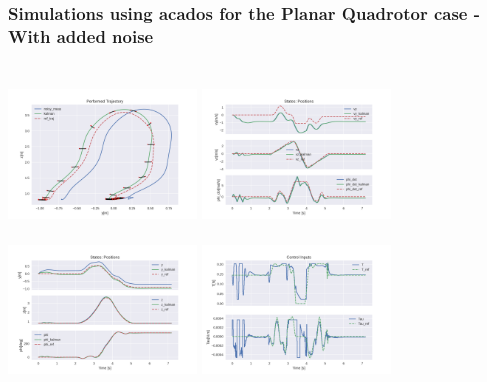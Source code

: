 \documentclass{thesisbeamer}
\newcommand\Fontvi{\fontsize{9}{10}\selectfont}
\begin{document}
\begin{frame}
	\frametitle{Simulations using acados for the Planar Quadrotor case - With added noise}
	\Fontvi
	
	\begin{columns}[t]
		\centering
			\includegraphics[width=5cm,height=4cm]{Images/acados_simulations/flip_trajectory/planar_quadrotor/noisy/sim.png}
			\includegraphics[width=5cm,height=4cm]{Images/acados_simulations/flip_trajectory/planar_quadrotor/noisy/rateStates.png}
			\centering
			\includegraphics[width=5cm,height=4cm]{Images/acados_simulations/flip_trajectory/planar_quadrotor/noisy/posStates.png}
			\includegraphics[width=5cm,height=4cm]{Images/acados_simulations/flip_trajectory/planar_quadrotor/noisy/controlInputs.png}
	\end{columns}
	
	
\end{frame}
\end{document}
